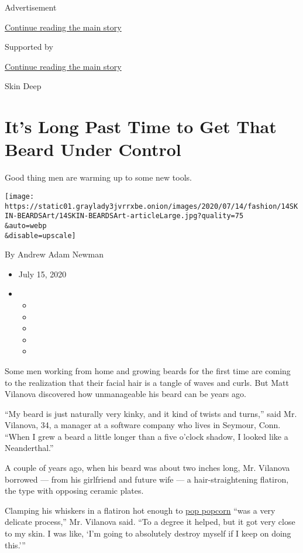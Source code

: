 Advertisement

\protect\hyperlink{after-top}{Continue reading the main story}

Supported by

\protect\hyperlink{after-sponsor}{Continue reading the main story}

Skin Deep

\hypertarget{its-long-past-time-to-get-that-beard-under-control}{%
\section{It's Long Past Time to Get That Beard Under
Control}\label{its-long-past-time-to-get-that-beard-under-control}}

Good thing men are warming up to some new tools.

\texttt{[image: https://static01.graylady3jvrrxbe.onion/images/2020/07/14/fashion/14SKIN-BEARDSArt/14SKIN-BEARDSArt-articleLarge.jpg?quality=75\\\&auto=webp\\\&disable=upscale]}

By Andrew Adam Newman

\begin{itemize}
\item
  July 15, 2020
\item
  \begin{itemize}
  \item
  \item
  \item
  \item
  \item
  \end{itemize}
\end{itemize}

Some men working from home and growing beards for the first time are
coming to the realization that their facial hair is a tangle of waves
and curls. But Matt Vilanova discovered how unmanageable his beard can
be years ago.

``My beard is just naturally very kinky, and it kind of twists and
turns,'' said Mr. Vilanova, 34, a manager at a software company who
lives in Seymour, Conn. ``When I grew a beard a little longer than a
five o'clock shadow, I looked like a Neanderthal.''

A couple of years ago, when his beard was about two inches long, Mr.
Vilanova borrowed --- from his girlfriend and future wife --- a
hair-straightening flatiron, the type with opposing ceramic plates.

Clamping his whiskers in a flatiron hot enough to
\href{https://www.youtube.com/watch?v=IhLEzuH3L40}{pop popcorn} ``was a
very delicate process,'' Mr. Vilanova said. ``To a degree it helped, but
it got very close to my skin. I was like, `I'm going to absolutely
destroy myself if I keep on doing this.'''

